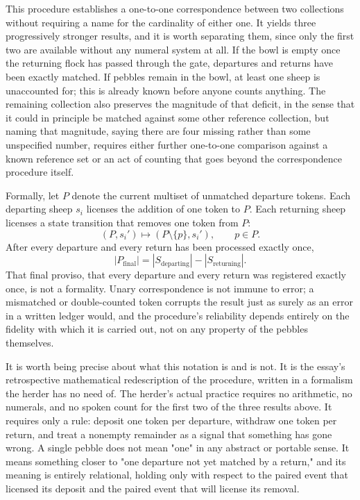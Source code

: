 \documentclass[11pt]{article}
\begin{document}
This procedure establishes a one-to-one correspondence between two collections without requiring a name for the cardinality of either one. It yields three progressively stronger results, and it is worth separating them, since only the first two are available without any numeral system at all. If the bowl is empty once the returning flock has passed through the gate, departures and returns have been exactly matched. If pebbles remain in the bowl, at least one sheep is unaccounted for; this is already known before anyone counts anything. The remaining collection also preserves the magnitude of that deficit, in the sense that it could in principle be matched against some other reference collection, but naming that magnitude, saying there are four missing rather than some unspecified number, requires either further one-to-one comparison against a known reference set or an act of counting that goes beyond the correspondence procedure itself.

Formally, let $P$ denote the current multiset of unmatched departure tokens. Each departing sheep $s_i$ licenses the addition of one token to $P$. Each returning sheep licenses a state transition that removes one token from $P$:
\[
(P, s_i') \longmapsto (P \setminus \{p\}, s_i'), \qquad p \in P.
\]
After every departure and every return has been processed exactly once,
\[
|P_{\text{final}}| = |S_{\text{departing}}| - |S_{\text{returning}}|.
\]
That final proviso, that every departure and every return was registered exactly once, is not a formality. Unary correspondence is not immune to error; a mismatched or double-counted token corrupts the result just as surely as an error in a written ledger would, and the procedure's reliability depends entirely on the fidelity with which it is carried out, not on any property of the pebbles themselves.

It is worth being precise about what this notation is and is not. It is the essay's retrospective mathematical redescription of the procedure, written in a formalism the herder has no need of. The herder's actual practice requires no arithmetic, no numerals, and no spoken count for the first two of the three results above. It requires only a rule: deposit one token per departure, withdraw one token per return, and treat a nonempty remainder as a signal that something has gone wrong. A single pebble does not mean "one" in any abstract or portable sense. It means something closer to "one departure not yet matched by a return," and its meaning is entirely relational, holding only with respect to the paired event that licensed its deposit and the paired event that will license its removal.
\end{document}
